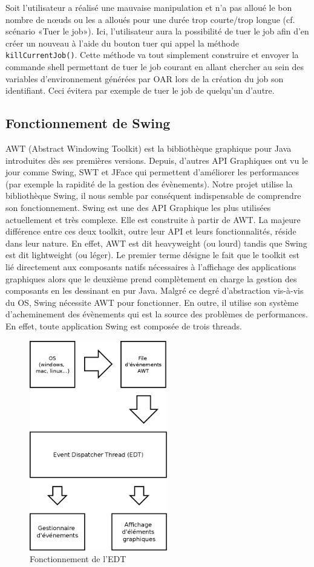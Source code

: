 \par Soit l’utilisateur a réalisé une mauvaise manipulation et n’a pas alloué le bon nombre de nœuds ou les a alloués pour une durée trop courte/trop longue (cf. scénario «Tuer le job»). Ici, l’utilisateur aura la possibilité de tuer le job afin d’en créer un nouveau à l’aide du bouton tuer qui appel la méthode \texttt{killCurrentJob()}. Cette méthode va tout simplement construire et envoyer la commande shell permettant de tuer le job courant en allant chercher au sein des variables d’environnement générées par OAR lors de la création du job son identifiant. Ceci évitera par exemple de tuer le job de quelqu’un d’autre.

\subsection{Fonctionnement de Swing}
\label{sec:fonct-de-swing}

AWT (Abstract Windowing Toolkit) est la bibliothèque graphique pour Java introduites dès ses premières versions. Depuis, d’autres API Graphiques ont vu le jour comme Swing, SWT et JFace qui permettent d’améliorer les performances (par exemple la rapidité de la gestion des évènements). Notre projet utilise la bibliothèque Swing, il nous semble par conséquent indispensable de comprendre son fonctionnement.
Swing est une des API Graphique les plus utilisées actuellement et très complexe. Elle est construite à partir de AWT. La majeure différence entre ces deux toolkit, outre leur API et leurs fonctionnalités, réside dans leur nature. En effet, AWT est dit heavyweight (ou lourd) tandis que Swing est dit lightweight (ou léger). Le premier terme désigne le fait que le toolkit est lié directement aux composants natifs nécessaires à l’affichage des applications graphiques alors que le deuxième prend complètement en charge la gestion des composants en les dessinant en pur Java.
Malgré ce degré d’abstraction vis-à-vis du OS, Swing nécessite AWT pour fonctionner. En outre, il utilise son système d’acheminement des évènements qui est la source des problèmes de performances. En effet, toute application Swing est composée de trois threads.

\begin{figure}[h!]
  \centering
  \includegraphics[width=6cm]{images/edt.png}
  \caption{Fonctionnement de l'EDT}
  \label{fig:edt}
\end{figure}


